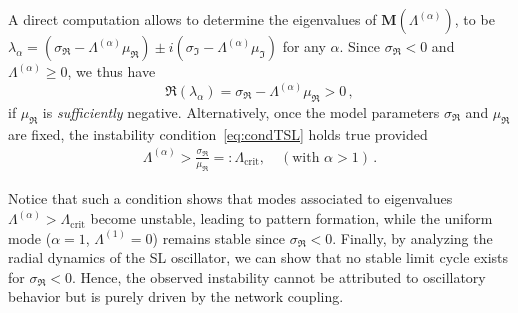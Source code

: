 \documentclass[aps,showpacs,preprintnumbers,amsmath,amssymb,twocolumn,superscriptaddress,floatfix,nofootinbib,10pt,pre]{revtex4-1}
\begin{document}
A direct computation allows to determine the  eigenvalues of $\mathbf M(\Lambda^{(\alpha)})$, to be $\lambda_\alpha = (\sigma_{\Re}-\Lambda^{(\alpha)}\mu_{\Re})
\pm i(\sigma_{\Im}-\Lambda^{(\alpha)}\mu_{\Im})$ for any $\alpha$.
Since $\sigma_{\Re}<0$ and $\Lambda^{(\alpha)} \geq 0$, we thus have
\begin{equation}
    \label{eq:condTSL}
\Re(\lambda_\alpha)=   \sigma_{\Re}-\Lambda^{(\alpha)}\mu_{\Re}>0\, ,
\end{equation}
if $\mu_{\Re}$ is \textit{sufficiently} negative.
Alternatively, once the model parameters $\sigma_{\Re}$ and $\mu_{\Re}$ are fixed, the instability condition~\eqref{eq:condTSL} holds true provided
\begin{align}\label{eq:condcritic}
\Lambda^{(\alpha)} > \frac{\sigma_{\Re}}{\mu_{\Re}} =: \Lambda_{\text{crit}},
\quad (\text{with }\alpha>1)\, .
\end{align}

Notice that such a condition shows that modes associated to eigenvalues $\Lambda^{(\alpha)} > \Lambda_{\text{crit}}$ 
become unstable, leading to pattern formation, while the uniform mode ($\alpha=1$, $\Lambda^{(1)}=0$) 
remains stable since $\sigma_{\Re}<0$. Finally, by analyzing the radial dynamics of the SL oscillator, we can show that no stable limit cycle exists for $\sigma_{\Re}<0$. Hence, the observed instability cannot be attributed to oscillatory behavior but is purely driven by the network coupling.\\


\end{document}
